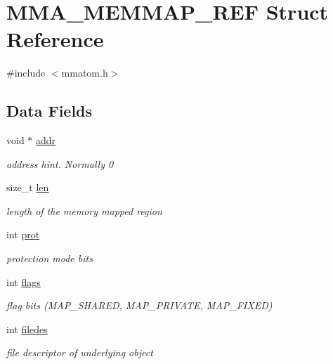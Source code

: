 \hypertarget{struct_m_m_a___m_e_m_m_a_p___r_e_f}{\section{M\-M\-A\-\_\-\-M\-E\-M\-M\-A\-P\-\_\-\-R\-E\-F Struct Reference}
\label{struct_m_m_a___m_e_m_m_a_p___r_e_f}
}


{\ttfamily \#include $<$mmatom.\-h$>$}

\subsection*{Data Fields}
\begin{DoxyCompactItemize}
\item 
void $\ast$ \hyperlink{struct_m_m_a___m_e_m_m_a_p___r_e_f_ae5bd6c22dbf0f6b5b0ae0233f8eb3704}{addr}
\begin{DoxyCompactList}\small\item\em address hint. Normally 0 \end{DoxyCompactList}\item 
size\-\_\-t \hyperlink{struct_m_m_a___m_e_m_m_a_p___r_e_f_a7360b55975153b822efc5217b7734e6a}{len}
\begin{DoxyCompactList}\small\item\em length of the memory mapped region \end{DoxyCompactList}\item 
int \hyperlink{struct_m_m_a___m_e_m_m_a_p___r_e_f_a55eaf976f72b18e313862d8f549a4ef0}{prot}
\begin{DoxyCompactList}\small\item\em protection mode bits \end{DoxyCompactList}\item 
int \hyperlink{struct_m_m_a___m_e_m_m_a_p___r_e_f_ac8bf36fe0577cba66bccda3a6f7e80a4}{flags}
\begin{DoxyCompactList}\small\item\em flag bits (M\-A\-P\-\_\-\-S\-H\-A\-R\-E\-D, M\-A\-P\-\_\-\-P\-R\-I\-V\-A\-T\-E, M\-A\-P\-\_\-\-F\-I\-X\-E\-D) \end{DoxyCompactList}\item 
int \hyperlink{struct_m_m_a___m_e_m_m_a_p___r_e_f_ac657804269d18c2152f07bc54c20874d}{filedes}
\begin{DoxyCompactList}\small\item\em file descriptor of underlying object \end{DoxyCompactList}\item 

\end{DoxyCompactItemize}
